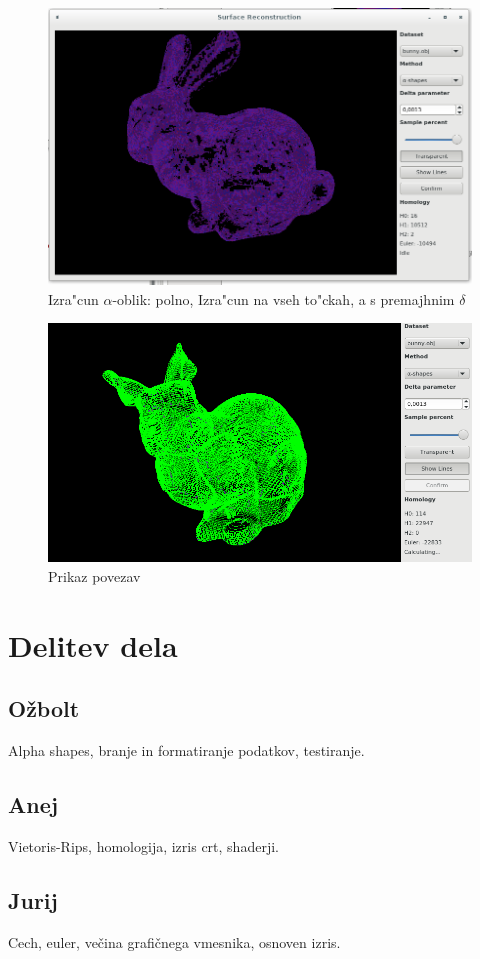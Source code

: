 \documentclass[11pt]{article}
\begin{document}
\begin{figure}[htb]
    \centering
    \includegraphics[width=1\textwidth]{alpha_lowdelta.png}
    \caption{Izra"cun $\alpha$-oblik: polno, Izra"cun na vseh to"ckah, a s premajhnim $\delta$}
    \label{fig:a1}
\end{figure}

\begin{figure}[htb]
    \centering
    \includegraphics[width=\textwidth]{lines.png}
    \caption{Prikaz povezav}
    \label{fig:edges}
\end{figure}


\section{Delitev dela}

\subsection{Ožbolt}
Alpha shapes, branje in formatiranje podatkov, testiranje. 

\subsection{Anej}
Vietoris-Rips, homologija, izris crt, shaderji.

\subsection{Jurij}
Cech, euler, večina grafičnega vmesnika, osnoven izris.
\end{document}
